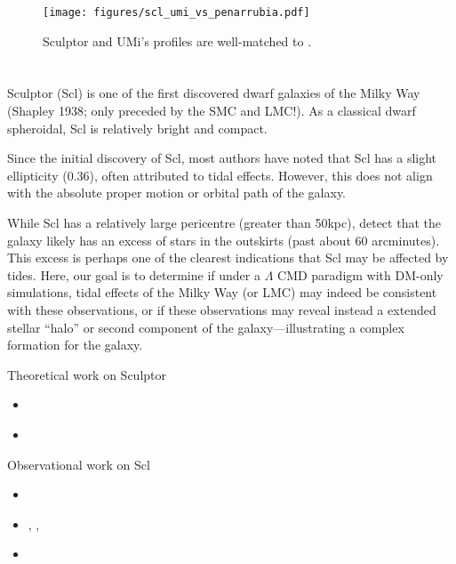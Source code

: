 \begin{figure}
\centering
\texttt{[image: figures/scl\_umi\_vs\_penarrubia.pdf]}
\caption[Idealized simulations match Scl and UMi]{Sculptor and UMi's
profiles are well-matched to \citet{PNM2008}.}\label{fig:toy_profiles}
\end{figure}

\section{}\label{section}

Sculptor (Scl) is one of the first discovered dwarf galaxies of the
Milky Way (Shapley 1938; only preceded by the SMC and LMC!). As a
classical dwarf spheroidal, Scl is relatively bright and compact.

Since the initial discovery of Scl, most authors have noted that Scl has
a slight ellipticity (\(0.36\)), often attributed to tidal effects.
However, this does not align with the absolute proper motion or orbital
path of the galaxy.

While Scl has a relatively large pericentre (greater than 50kpc),
\citet{sestito+2023a} detect that the galaxy likely has an excess of
stars in the outskirts (past about 60 arcminutes). This excess is
perhaps one of the clearest indications that Scl may be affected by
tides. Here, our goal is to determine if under a \(\Lambda\) CMD
paradigm with DM-only simulations, tidal effects of the Milky Way (or
LMC) may indeed be consistent with these observations, or if these
observations may reveal instead a extended stellar ``halo'' or second
component of the galaxy---illustrating a complex formation for the
galaxy.

Theoretical work on Sculptor

\begin{itemize}
\tightlist
\item
  \citet{battaglia+2008}
\item
  \citet{iorio+2019}
\end{itemize}

Observational work on Scl

\begin{itemize}
\tightlist
\item
  \citet{sestito+2023a}
\item
  \citet{tolstoy+2023}, \citet{arroyo-polonio+2023},
  \citet{arroyo-polonio+2024}
\item
  \citet{eskridge1988}
\end{itemize}

